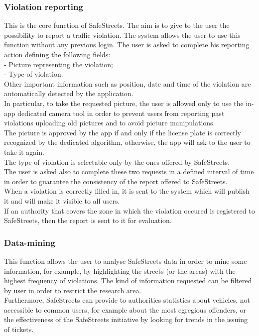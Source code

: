 \documentclass{article}
\begin{document}
			\subsubsection{Violation reporting}
				This is the core function of SafeStreets. The aim is to give to the user the possibility to report a traffic violation. The system allows the user to use this function without any previous login. The user is asked to complete his reporting action defining the following fields:\\
				- Picture representing the violation;\\
				- Type of violation.\\
				Other important information such as position, date and time of the violation are automatically detected by the application.\\
				In particular, to take the requested picture, the user is allowed only to use the in-app dedicated camera tool in order to prevent users from reporting past violations uploading old pictures and to avoid picture manipulations.\\ The picture is approved by the app if and only if the license plate is correctly recognized by the dedicated algorithm, otherwise, the app will ask to the user to take it again.
				\\The type of violation is selectable only by the ones offered by SafeStreets.\\ The user is asked also to complete these two requests in a defined interval of time in order to guarantee the consistency of the report offered to SafeStreets.\\
				When a violation is correctly filled in, it is sent to the system which will publish it and will make it visible to all users.\\
				If an authority that covers the zone in which the violation occured is registered to SafeStreets, then the report is sent to it for evaluation.
		
			\subsubsection{Data-mining}
				This function allows the user to analyse SafeStreets data in order to mine some information, for example, by highlighting the streets (or the areas) with the highest frequency of violations. The kind of information requested can be filtered by user in order to restrict the research area.\\
				Furthermore, SafeStreets can provide to authorities statistics about vehicles, not accessible to common users, for example about the most egregious offenders, or the effectiveness of the SafeStreets initiative by looking for trends in the issuing of tickets.\\
				
\end{document}
